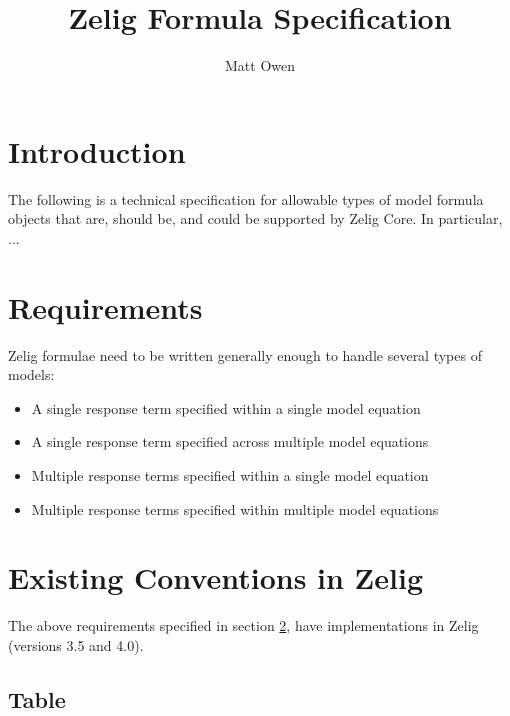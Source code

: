 \documentclass{article}
\title{Zelig Formula Specification}
\author{Matt Owen}
\begin{document}
\maketitle

\section{Introduction}

The following is a technical specification for allowable types of model formula
objects that are, should be, and could be supported by Zelig Core. In
particular, ...



%
%
%
\section{Requirements}
\label{sec:req}

Zelig formulae need to be written generally enough to handle several types of
models:

\begin{itemize}

  \item A single response term specified within a single model equation

  \item A single response term specified across multiple model equations

  \item Multiple response terms specified within a single model equation

  \item Multiple response terms specified within multiple model equations
\end{itemize}




%
%
%
\section{Existing Conventions in Zelig}
\label{sec:existing-zelig}

The above requirements specified in section \ref{sec:req}, have implementations
in Zelig (versions 3.5 and 4.0).


\subsection{Table}
\end{document}

